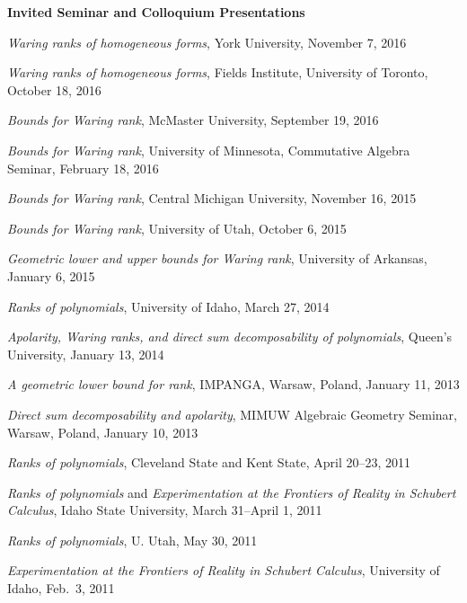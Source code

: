 \documentclass[12pt]{article}
\begin{document}


\textbf{Invited Seminar and Colloquium Presentations}
\begin{description}
\setlength{}
\item[] \textit{Waring ranks of homogeneous forms}, York University, November 7, 2016
\item[] \textit{Waring ranks of homogeneous forms}, Fields Institute, University of Toronto, October 18, 2016
\item[] \textit{Bounds for Waring rank}, McMaster University, September 19, 2016
\item[] \textit{Bounds for Waring rank}, University of Minnesota, Commutative Algebra Seminar, February 18, 2016
\item[] \textit{Bounds for Waring rank}, Central Michigan University, November 16, 2015
\item[] \textit{Bounds for Waring rank}, University of Utah, October 6, 2015
\item[] \textit{Geometric lower and upper bounds for Waring rank}, University of Arkansas, January 6, 2015
\item[] \textit{Ranks of polynomials}, University of Idaho, March 27, 2014
\item[] \textit{Apolarity, Waring ranks, and direct sum decomposability of polynomials}, Queen's University, January 13, 2014
\item[] \textit{A geometric lower bound for rank}, IMPANGA, Warsaw, Poland, January 11, 2013
\item[] \textit{Direct sum decomposability and apolarity}, MIMUW Algebraic Geometry Seminar, Warsaw, Poland, January 10, 2013
\item[] \textit{Ranks of polynomials}, Cleveland State and Kent State, April 20--23, 2011
\item[] \textit{Ranks of polynomials} and \textit{Experimentation at the Frontiers of Reality in Schubert Calculus}, Idaho State University, March 31--April 1, 2011
\item[] \textit{Ranks of polynomials}, U. Utah, May 30, 2011
\item[] \textit{Experimentation at the Frontiers of Reality in Schubert Calculus}, University of Idaho, Feb.\ 3, 2011


\end{description}
\end{document}
